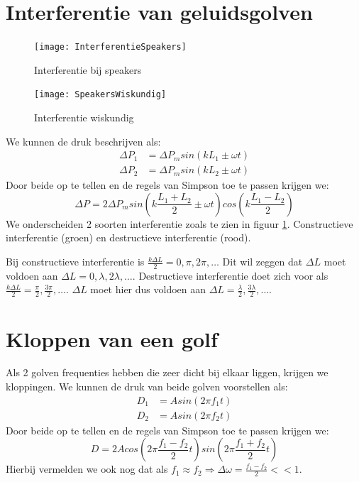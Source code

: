 \documentclass[a4paper,kul]{kulakarticle} %
\begin{document}
\section{Interferentie van geluidsgolven}
\begin{figure}[h]
	\centering
	\texttt{[image: InterferentieSpeakers]}
	\caption[Interferentie]{Interferentie bij speakers}
	\label{fig:interferentiespeakers}
\end{figure}
\begin{figure}[h]
	\centering
	\texttt{[image: SpeakersWiskundig]}
	\caption[Interferentie wiskundig]{Interferentie wiskundig}
	\label{fig:speakerswiskundig}
\end{figure}
We kunnen de druk beschrijven als:
\begin{align*}
	\Delta P_1 &= \Delta P_msin(kL_1\pm\omega t)\\
	\Delta P_2 &= \Delta P_msin(kL_2\pm\omega t)
\end{align*}
Door beide op te tellen en de regels van Simpson toe te passen krijgen we:
\begin{equation*}
	\Delta P = 2\Delta P_msin(k\frac{L_1+L_2}{2}\pm\omega t)cos(k\frac{L_1-L_2}{2})
\end{equation*}
We onderscheiden 2 soorten interferentie zoals te zien in figuur \ref{fig:interferentiespeakers}. Constructieve interferentie (groen) en destructieve interferentie (rood).

Bij constructieve interferentie is $\frac{k\Delta L}{2}=0,\pi,2\pi,\ldots$ Dit wil zeggen dat $\Delta L$ moet voldoen aan $\Delta L = 0,\lambda,2\lambda,\ldots$. Destructieve interferentie doet zich voor als $\frac{k\Delta L}{2}=\frac{\pi}{2},\frac{3\pi}{2},\ldots$. $\Delta L$ moet hier dus voldoen aan $\Delta L = \frac{\lambda}{2},\frac{3\lambda}{2},\ldots$.

\newpage
\section{Kloppen van een golf}
Als 2 golven frequenties hebben die zeer dicht bij elkaar liggen, krijgen we kloppingen. We kunnen de druk van beide golven voorstellen als:
\begin{align*}
	D_1&=Asin(2\pi f_1t)\\
	D_2&=Asin(2\pi f_2t)
\end{align*}
Door beide op te tellen en de regels van Simpson toe te passen krijgen we:
\begin{equation*}
	D=2Acos(2\pi\frac{f_1-f_2}{2}t)sin(2\pi\frac{f_1+f_2}{2}t)
\end{equation*}
Hierbij vermelden we ook nog dat als $f_1\approx f_2\Rightarrow\Delta\omega=\frac{f_1-f_2}{2}<<1$.
\end{document}
